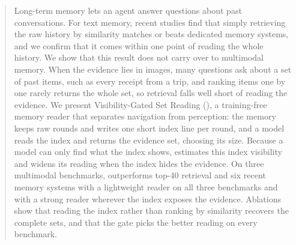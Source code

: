 \begin{abstract}
Long-term memory lets an agent answer questions about past conversations. For text memory, recent studies find that simply retrieving the raw history by similarity matches or beats dedicated memory systems, and we confirm that it comes within one point of reading the whole history. We show that this result does not carry over to multimodal memory. When the evidence lies in images, many questions ask about a set of past items, such as every receipt from a trip, and ranking items one by one rarely returns the whole set, so retrieval falls well short of reading the evidence. We present Visibility-Gated Set Reading (\vgs{}), a training-free memory reader that separates navigation from perception: the memory keeps raw rounds and writes one short index line per round, and a model reads the index and returns the evidence set, choosing its size. Because a model can only find what the index shows, \vgs{} estimates this index visibility and widens its reading when the index hides the evidence. On three multimodal benchmarks, \vgs{} outperforms top-40 retrieval and six recent memory systems with a lightweight reader on all three benchmarks and with a strong reader wherever the index exposes the evidence. Ablations show that reading the index rather than ranking by similarity recovers the complete sets, and that the gate picks the better reading on every benchmark.
\end{abstract}
